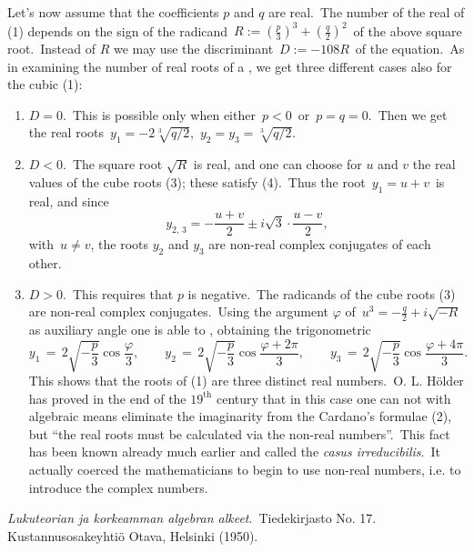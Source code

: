 \documentclass[12pt]{article}
\theoremstyle{definition}
\begin{document}
Let's now assume that the coefficients $p$ and $q$ are real.\, The number of the real  of (1) depends on the sign of the radicand 
\,$\displaystyle R := \left(\frac{p}{3}\right)^3\!+\!\left(\frac{q}{2}\right)^2$\, 
of the above square root.\, Instead of $R$ we may use the discriminant \,$D := -108R$\, of the equation.\, As in examining the number of real roots of a , we get three different cases also for the cubic (1):
\begin{enumerate}
\item $D = 0$.\, This is possible only when either\, $p < 0$\, or\, $p = q = 0$.\, Then we get the real roots\, $y_1 = -2\sqrt[3]{q/2}$,\, 
$y_2 = y_3 = \sqrt[3]{q/2}$.
\item $D < 0$.\, The square root $\sqrt{R}$ is real, and one can choose for $u$ and $v$ the real values of the cube roots (3); these satisfy (4).\, Thus the root\, $y_1 = u+v$\, is real, and since 
$$y_{2,\,3} = -\frac{u+v}{2}\pm i\sqrt{3}\cdot\!\frac{u-v}{2},$$
with\, $u \neq v$, the roots $y_2$ and $y_3$ are non-real complex conjugates of each other.
\item $D > 0$.\, This requires that $p$ is negative.\, The radicands of the cube roots (3) are non-real complex conjugates.\, Using the argument $\varphi$ of\, $u^3 = -\frac{q}{2}+i\sqrt{-R}$\, as auxiliary angle one is able to , obtaining the trigonometric 
$$y_1 \,=\, 2\sqrt{-\frac{p}{3}}\cos\frac{\varphi}{3},\qquad
y_2 \,=\, 2\sqrt{-\frac{p}{3}}\cos\frac{\varphi+2\pi}{3},\qquad
y_3 \,=\, 2\sqrt{-\frac{p}{3}}\cos\frac{\varphi+4\pi}{3}.$$
This shows that the roots of (1) are three distinct real numbers.\, O. L. H\"older has proved in the end of the $19^\mathrm{th}$ century that in this case one can not with algebraic means eliminate the imaginarity from the Cardano's formulae (2), but ``the real roots must be calculated via the non-real numbers''.\, This fact has been known already much earlier and called the {\em casus irreducibilis}.\, It actually coerced the mathematicians to begin to use non-real numbers, i.e. to introduce the complex numbers.
\end{enumerate}

\begin{thebibliography}{9}
 {\em Lukuteorian ja korkeamman algebran alkeet}. \,Tiedekirjasto No. 17. \, Kustannusosakeyhti\"o Otava, Helsinki (1950).
\end{thebibliography}
\end{document}
